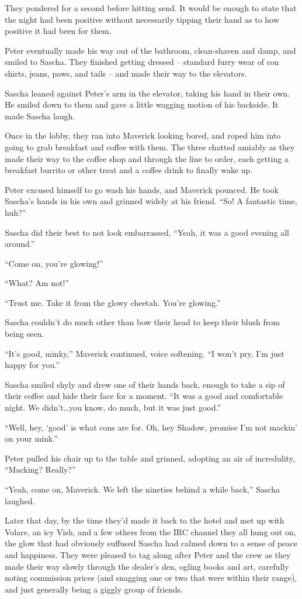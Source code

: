 They pondered for a second before hitting send. It would be enough to state that the night had been positive without necessarily tipping their hand as to how positive it had been for them.

Peter eventually made his way out of the bathroom, clean-shaven and damp, and smiled to Sascha. They finished getting dressed -- standard furry wear of con shirts, jeans, paws, and tails -- and made their way to the elevators.

Sascha leaned against Peter's arm in the elevator, taking his hand in their own. He smiled down to them and gave a little wagging motion of his backside. It made Sascha laugh.

Once in the lobby, they ran into Maverick looking bored, and roped him into going to grab breakfast and coffee with them. The three chatted amiably as they made their way to the coffee shop and through the line to order, each getting a breakfast burrito or other treat and a coffee drink to finally wake up.

Peter excused himself to go wash his hands, and Maverick pounced. He took Sascha's hands in his own and grinned widely at his friend. ``So! A fantastic time, huh?''

Sascha did their best to not look embarrassed, ``Yeah, it was a good evening all around.''

``Come on, you're glowing!''

``What? Am not!''

``Trust me. Take it from the glowy cheetah.  You're glowing.''

Sascha couldn't do much other than bow their head to keep their blush from being seen.

``It's good, minky,'' Maverick continued, voice softening. ``I won't pry, I'm just happy for you.''

Sascha smiled shyly and drew one of their hands back, enough to take a sip of their coffee and hide their face for a moment. ``It was a good and comfortable night. We didn't\ldots{}you know, do much, but it was just good.''

``Well, hey, `good' is what cons are for. Oh, hey Shadow, promise I'm not mackin' on your mink.''

Peter pulled his chair up to the table and grinned, adopting an air of incredulity, ``Macking? Really?''

``Yeah, come on, Maverick. We left the nineties behind a while back,'' Sascha laughed.

Later that day, by the time they'd made it back to the hotel and met up with Volare, an icy Vish, and a few others from the IRC channel they all hung out on, the glow that had obviously suffused Sascha had calmed down to a sense of peace and happiness. They were pleased to tag along after Peter and the crew as they made their way slowly through the dealer's den, ogling books and art, carefully noting commission prices (and snagging one or two that were within their range), and just generally being a giggly group of friends.

